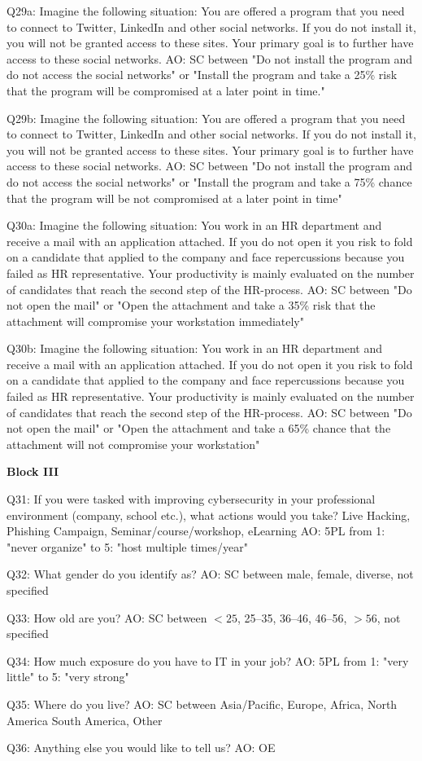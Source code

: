 Q29a: Imagine the following situation: You are offered a program that you need to connect to Twitter, LinkedIn and other social networks. If you do not install it, you will not be granted access to these sites. Your primary goal is to further have access to these social networks. AO: SC between "Do not install the program and do not access the social networks" or "Install the program and take a 25\% risk that the program will be compromised at a later point in time."

Q29b: Imagine the following situation: You are offered a program that you need to connect to Twitter, LinkedIn and other social networks. If you do not install it, you will not be granted access to these sites. Your primary goal is to further have access to these social networks. AO: SC between "Do not install the program and do not access the social networks" or "Install the program and take a 75\% chance that the program will be not compromised at a later point in time"

Q30a: Imagine the following situation: You work in an HR department and receive a mail with an application attached. If you do not open it you risk to fold on a candidate that applied to the company and face repercussions because you failed as HR representative. Your productivity is mainly evaluated on the number of candidates that reach the second step of the HR-process. AO: SC between "Do not open the mail" or "Open the attachment and take a 35\% risk that the attachment will compromise your workstation immediately"

Q30b: Imagine the following situation: You work in an HR department and receive a mail with an application attached. If you do not open it you risk to fold on a candidate that applied to the company and face repercussions because you failed as HR representative. Your productivity is mainly evaluated on the number of candidates that reach the second step of the HR-process. AO: SC between "Do not open the mail" or "Open the attachment and take a 65\% chance that the attachment will not compromise your workstation"

\textbf{Block III}

Q31: If you were tasked with improving cybersecurity in your professional environment (company, school etc.), what actions would you take? Live Hacking, Phishing Campaign, Seminar/course/workshop, eLearning AO: 5PL from 1: "never organize" to 5: "host multiple times/year"

Q32: What gender do you identify as? AO: SC between male, female, diverse, not specified

Q33: How old are you? AO: SC between $<25$, 25--35, 36--46, 46--56, $>56$, not specified

Q34: How much exposure do you have to IT in your job? AO: 5PL from 1: "very little" to 5: "very strong"

Q35: Where do you live? AO: SC between Asia/Pacific, Europe, Africa, North America South America, Other

Q36: Anything else you would like to tell us? AO: OE

